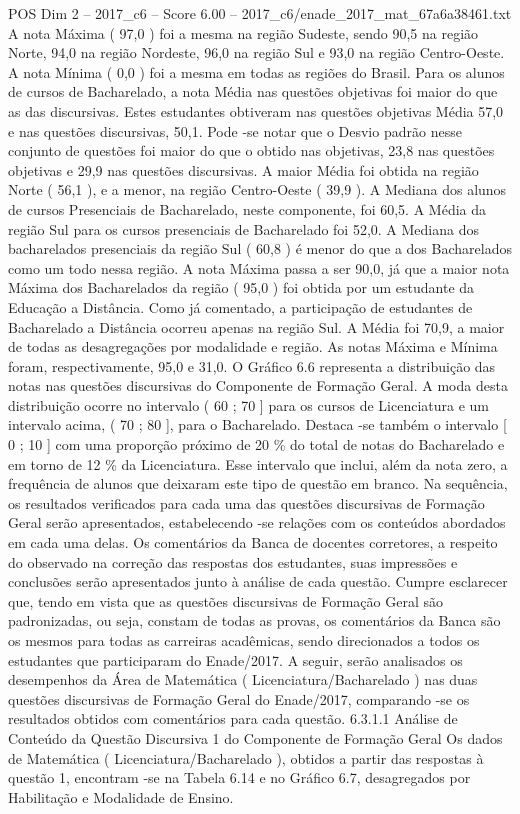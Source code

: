 \begin{textsample}{POS Dim 2 – 2017\_c6 – Score 6.00 – 2017\_c6/enade\_2017\_mat\_67a6a38461.txt}
A nota Máxima ( 97,0 ) foi a mesma na região Sudeste, sendo 90,5 na região Norte, 94,0 na região Nordeste, 96,0 na região Sul e 93,0 na região Centro-Oeste.
A nota Mínima ( 0,0 ) foi a mesma em todas as regiões do Brasil.
Para os alunos de cursos de Bacharelado, a nota Média nas questões objetivas foi maior do que as das discursivas.
Estes estudantes obtiveram nas questões objetivas Média 57,0 e nas questões discursivas, 50,1.
Pode -se notar que o Desvio padrão nesse conjunto de questões foi maior do que o obtido nas objetivas, 23,8 nas questões objetivas e 29,9 nas questões discursivas.
A maior Média foi obtida na região Norte ( 56,1 ), e a menor, na região Centro-Oeste ( 39,9 ).
A Mediana dos alunos de cursos Presenciais de Bacharelado, neste componente, foi 60,5.
A Média da região Sul para os cursos presenciais de Bacharelado foi 52,0.
A Mediana dos bacharelados presenciais da região Sul ( 60,8 ) é menor do que a dos Bacharelados como um todo nessa região.
A nota Máxima passa a ser 90,0, já que a maior nota Máxima dos Bacharelados da região ( 95,0 ) foi obtida por um estudante da Educação a Distância.
Como já comentado, a participação de estudantes de Bacharelado a Distância ocorreu apenas na região Sul.
A Média foi 70,9, a maior de todas as desagregações por modalidade e região.
As notas Máxima e Mínima foram, respectivamente, 95,0 e 31,0.
O Gráfico 6.6 representa a distribuição das notas nas questões discursivas do Componente de Formação Geral.
A moda desta distribuição ocorre no intervalo ( 60 ; 70 ] para os cursos de Licenciatura e um intervalo acima, ( 70 ; 80 ], para o Bacharelado.
Destaca -se também o intervalo [ 0 ; 10 ] com uma proporção próximo de 20 \% do total de notas do Bacharelado e em torno de 12 \% da Licenciatura.
Esse intervalo que inclui, além da nota zero, a frequência de alunos que deixaram este tipo de questão em branco.
Na sequência, os resultados verificados para cada uma das questões discursivas de Formação Geral serão apresentados, estabelecendo -se relações com os conteúdos abordados em cada uma delas.
Os comentários da Banca de docentes corretores, a respeito do observado na correção das respostas dos estudantes, suas impressões e conclusões serão apresentados junto à análise de cada questão.
Cumpre esclarecer que, tendo em vista que as questões discursivas de Formação Geral são padronizadas, ou seja, constam de todas as provas, os comentários da Banca são os mesmos para todas as carreiras acadêmicas, sendo direcionados a todos os estudantes que participaram do Enade/2017.
A seguir, serão analisados os desempenhos da Área de Matemática ( Licenciatura/Bacharelado ) nas duas questões discursivas de Formação Geral do Enade/2017, comparando -se os resultados obtidos com comentários para cada questão. 6.3.1.1 Análise de Conteúdo da Questão Discursiva 1 do Componente de Formação Geral Os dados de Matemática ( Licenciatura/Bacharelado ), obtidos a partir das respostas à questão 1, encontram -se na Tabela 6.14 e no Gráfico 6.7, desagregados por Habilitação e Modalidade de Ensino.

\end{textsample}
